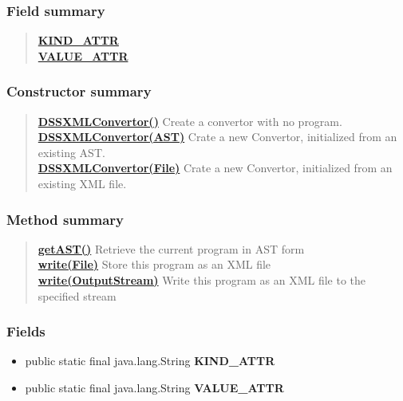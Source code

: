 {{{{\subsubsection{Field summary}{
\begin{verse}
\hyperlink{org.openmrs.module.dssmodule.DSSXMLConvertor.KIND_ATTR}{{\bf KIND\_ATTR}} \\
\hyperlink{org.openmrs.module.dssmodule.DSSXMLConvertor.VALUE_ATTR}{{\bf VALUE\_ATTR}} \\
\end{verse}
}
\subsubsection{Constructor summary}{
\begin{verse}
\hyperlink{org.openmrs.module.dssmodule.DSSXMLConvertor()}{{\bf DSSXMLConvertor()}} Create a convertor with no program.\\
\hyperlink{org.openmrs.module.dssmodule.DSSXMLConvertor(org.openmrs.module.dssmodule.ast.AST)}{{\bf DSSXMLConvertor(AST)}} Crate a new Convertor, initialized from an existing AST.\\
\hyperlink{org.openmrs.module.dssmodule.DSSXMLConvertor(java.io.File)}{{\bf DSSXMLConvertor(File)}} Crate a new Convertor, initialized from an existing XML file.\\
\end{verse}
}
\subsubsection{Method summary}{
\begin{verse}
\hyperlink{org.openmrs.module.dssmodule.DSSXMLConvertor.getAST()}{{\bf getAST()}} Retrieve the current program in AST form\\
\hyperlink{org.openmrs.module.dssmodule.DSSXMLConvertor.write(java.io.File)}{{\bf write(File)}} Store this program as an XML file\\
\hyperlink{org.openmrs.module.dssmodule.DSSXMLConvertor.write(java.io.OutputStream)}{{\bf write(OutputStream)}} Write this program as an XML file to the specified stream\\
\end{verse}
}
\subsubsection{Fields}{
\begin{itemize}
\item{
\label{org.openmrs.module.dssmodule.DSSXMLConvertor.KIND_ATTR}\hypertarget{org.openmrs.module.dssmodule.DSSXMLConvertor.KIND_ATTR}{public static final java.lang.String {\bf  KIND\_ATTR}}
}
\item{
\label{org.openmrs.module.dssmodule.DSSXMLConvertor.VALUE_ATTR}\hypertarget{org.openmrs.module.dssmodule.DSSXMLConvertor.VALUE_ATTR}{public static final java.lang.String {\bf  VALUE\_ATTR}}
}
\end{itemize}
}
}}}}
